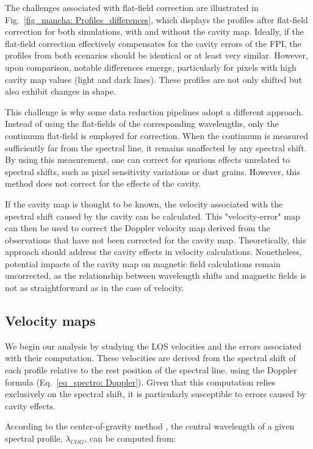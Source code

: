 The challenges associated with flat-field correction are illustrated in Fig.~\ref{fig_mancha: Profiles_differences}, which displays the profiles after flat-field correction for both simulations, with and without the cavity map. Ideally, if the flat-field correction effectively compensates for the cavity errors of the FPI, the profiles from both scenarios should be identical or at least very similar. However, upon comparison, notable differences emerge, particularly for pixels with high cavity map values (light and dark lines). These profiles are not only shifted but also exhibit changes in shape. 

This challenge is why some data reduction pipelines adopt a different approach. Instead of using the flat-fields of the corresponding wavelengths, only the continuum flat-field is employed for correction. When the continuum is measured sufficiently far from the spectral line, it remains unaffected by any spectral shift. By using this measurement, one can correct for spurious effects unrelated to spectral shifts, such as pixel sensitivity variations or dust grains. However, this method does not correct for the effects of the cavity.

If the cavity map is thought to be known, the velocity associated with the spectral shift caused by the cavity can be calculated. This "velocity-error" map can then be used to correct the Doppler velocity map derived from the observations that have not been corrected for the cavity map. Theoretically, this approach should address the cavity effects in velocity calculations. Nonetheless, potential impacts of the cavity map on magnetic field calculations remain uncorrected, as the relationship between wavelength shifts and magnetic fields is not as straightforward as in the case of velocity.

\subsection{Velocity maps}

We begin our analysis by studying the LOS velocities and the errors associated with their computation. These velocities are derived from the spectral shift of each profile relative to the rest position of the spectral line, using the Doppler formula (Eq.~\eqref{eq_spectro: Doppler}). Given that this computation relies exclusively on the spectral shift, it is particularly susceptible to errors caused by cavity effects.

According to the center-of-gravity method \citep{center_of_gravity}, the central wavelength of a given spectral profile, $\lambda _ {COG}$, can be computed from:

